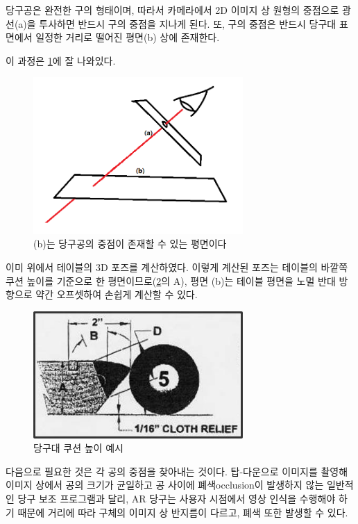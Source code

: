 \documentclass[10pt]{oblivoir}
\newcommand{\textss}[1]{\scriptsize#1\normalsize}
\begin{document}
당구공은 완전한 구의 형태이며, 따라서 카메라에서 2D 이미지 상 원형의 중점으로 광선(a)을 투사하면 반드시 구의 중점을 지나게 된다. 또, 구의 중점은 반드시 당구대 표면에서 일정한 거리로 떨어진 평면(b) 상에 존재한다.

이 과정은 \cref{fig;ball-recognition-howto}에 잘 나와있다.

\begin{figure}[ht]
    \centering
    \includegraphics[width=8cm]{img/ball-recognition-howto.png}
    \caption{(b)는 당구공의 중점이 존재할 수 있는 평면이다}
    \label{fig;ball-recognition-howto}
\end{figure}

이미 위에서 테이블의 3D 포즈를 계산하였다. 이렇게 계산된 포즈는 테이블의 바깥쪽 쿠션 높이를 기준으로 한 평면이므로(\cref{fig;cushion-height-example}의 A), 평면 (b)는 테이블 평면을 노멀 반대 방향으로 약간 오프셋하여 손쉽게 계산할 수 있다.

\begin{figure}[ht]
    \centering
    \includegraphics[width=8cm]{img/cushion-height-example.png}
    \caption[Caption for LOF]{당구대 쿠션 높이 예시\footnotemark}
    \label{fig;cushion-height-example}
\end{figure}

다음으로 필요한 것은 각 공의 중점을 찾아내는 것이다. 탑-다운으로 이미지를 촬영해 이미지 상에서 공의 크기가 균일하고 공 사이에 폐색\textss{occlusion}이 발생하지 않는 일반적인 당구 보조 프로그램과 달리, AR 당구는 사용자 시점에서 영상 인식을 수행해야 하기 때문에 거리에 따라 구체의 이미지 상 반지름이 다르고, 폐색 또한 발생할 수 있다.
\end{document}
